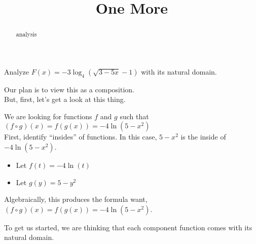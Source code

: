 \documentclass{ximera}
\title{One More}
\begin{document}
\begin{abstract}
analysis
\end{abstract}
\maketitle












Analyze $F(x) = -3 \log_4(\sqrt{3 - 5x} - 1)$ with its natural domain. \\









Our plan is to view this as a composition. \\



But, first, let's get a look at this thing. \\



\begin{center}
\end{center}









We are looking for functions $f$ and $g$ such that $(f \circ g)(x) = f(g(x)) = -4 \ln(5 - x^2)$ \\


First, identify ``insides'' of functions.  In this case, $5 - x^2$ is the inside of $-4 \ln(5 - x^2)$. \\



\begin{itemize}
\item Let $f(t) = -4 \ln(t)$ \\
\item Let $g(y) = 5 - y^2$ \\
\end{itemize}

Algebraically, this produces the formula want, $(f \circ g)(x) = f(g(x)) = -4 \ln(5 - x^2)$.


To get us started, we are thinking that each component function comes with its natural domain.
\end{document}
